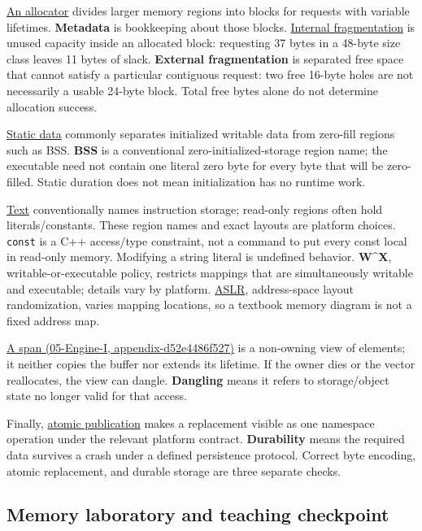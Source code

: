 \hyperref[appendix-c3480f7d9ff3]{An allocator} divides larger memory regions into blocks for requests with variable lifetimes. \textbf{Metadata} is bookkeeping about those blocks. \hyperref[appendix-a7c50686d81f]{Internal fragmentation} is unused capacity inside an allocated block: requesting 37 bytes in a 48-byte size class leaves 11 bytes of slack. \textbf{External fragmentation} is separated free space that cannot satisfy a particular contiguous request: two free 16-byte holes are not necessarily a usable 24-byte block. Total free bytes alone do not determine allocation success.

\hyperref[appendix-17c93c4c2f19]{Static data} commonly separates initialized writable data from zero-fill regions such as BSS. \textbf{BSS} is a conventional zero-initialized-storage region name; the executable need not contain one literal zero byte for every byte that will be zero-filled. Static duration does not mean initialization has no runtime work.

\hyperref[appendix-5f9e5e2f0a5e]{Text} conventionally names instruction storage; read-only regions often hold literals/constants. These region names and exact layouts are platform choices. \texttt{const} is a C++ access/type constraint, not a command to put every const local in read-only memory. Modifying a string literal is undefined behavior. \textbf{W\^{}X}, writable-or-executable policy, restricts mappings that are simultaneously writable and executable; details vary by platform. \hyperref[appendix-78cb248c8355]{ASLR}, address-space layout randomization, varies mapping locations, so a textbook memory diagram is not a fixed address map.

\href{../05-Engine-I/main.pdf\#nameddest=appendix-d52e4486f527}{A span (05-Engine-I, appendix-d52e4486f527)} is a non-owning view of elements; it neither copies the buffer nor extends its lifetime. If the owner dies or the vector reallocates, the view can dangle. \textbf{Dangling} means it refers to storage/object state no longer valid for that access.

Finally, \hyperref[appendix-e89a8f290ef5]{atomic publication} makes a replacement visible as one namespace operation under the relevant platform contract. \textbf{Durability} means the required data survives a crash under a defined persistence protocol. Correct byte encoding, atomic replacement, and durable storage are three separate checks.

\subsection{Memory laboratory and teaching checkpoint}\label{01-foundations-i-ch002-memory-laboratory-and-teaching-checkpoint}

